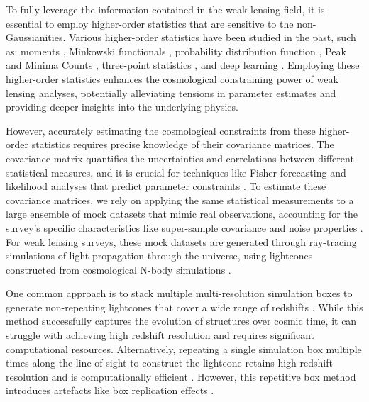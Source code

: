 To fully leverage the information contained in the weak lensing field, it is essential to employ higher-order statistics that are sensitive to the non-Gaussianities. Various higher-order statistics have been studied in the past, such as: moments \citep{2015PhRvD..91j3511P, 2020MNRAS.498.4060G}, Minkowski functionals \citep{2019JCAP...06..019M, 2022OJAp....5E..13G}, probability distribution function \citep{2021MNRAS.505.2886B, 2023arXiv230405928T, 2023OJAp....6E...1U}, Peak and Minima Counts \citep{2018MNRAS.474..712M, 2024MNRAS.528.4513M}, three-point statistics \citep{2004MNRAS.348..897T, 2014MNRAS.441.2725F}, and deep learning \citep{2018JCAP...10..051F, 2022PhRvD.105h3518F}. Employing these higher-order statistics enhances the cosmological constraining power of weak lensing analyses, potentially alleviating tensions in parameter estimates and providing deeper insights into the underlying physics.

However, accurately estimating the cosmological constraints from these higher-order statistics requires precise knowledge of their covariance matrices. The covariance matrix quantifies the uncertainties and correlations between different statistical measures, and it is crucial for techniques like Fisher forecasting and likelihood analyses that predict parameter constraints \citep{1997PhRvL..79.3806T}. To estimate these covariance matrices, we rely on applying the same statistical measurements to a large ensemble of mock datasets that mimic real observations, accounting for the survey's specific characteristics like super-sample covariance \citep{PhysRevD.87.123504} and noise properties \citep{2019MNRAS.490.2606W}. For weak lensing surveys, these mock datasets are generated through ray-tracing simulations of light propagation through the universe, using lightcones constructed from cosmological N-body simulations \citep{2019MNRAS.486...52S, 2024arXiv240513495E}.

One common approach is to stack multiple multi-resolution simulation boxes to generate non-repeating lightcones that cover a wide range of redshifts \citep{2015MNRAS.448.2987F, 2015MNRAS.453.1513C, 2017ApJ...850...24T, 2019ApJ...875...69D}. While this method successfully captures the evolution of structures over cosmic time, it can struggle with achieving high redshift resolution and requires significant computational resources. Alternatively, repeating a single simulation box multiple times along the line of sight to construct the lightcone retains high redshift resolution and is computationally efficient \citep{2010ApJ...709..920S, 2018JCAP...03..049L, 2020JCAP...10..012S, 2024MNRAS.530.5030O}. However, this repetitive box method introduces artefacts like box replication effects \citep{2024MNRAS.534.1205C}.

